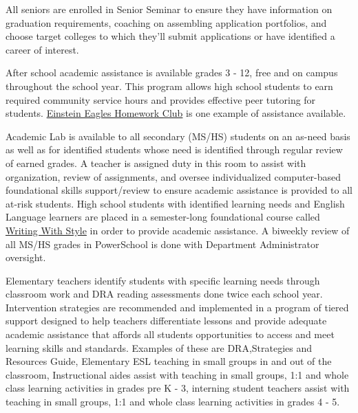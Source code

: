 \begin{findings}
All seniors are enrolled in Senior Seminar to ensure they have information on graduation requirements, coaching on assembling application portfolios, and choose target colleges to which they’ll submit applications or have identified a career of interest.

After school academic assistance is available grades 3 - 12, free and on campus throughout the school year. This program allows high school students to earn required community service hours and provides effective peer tutoring for students.  \href{http://blogs.cmis.ac.th/newsletter/2015/09/17/einstein-eagles-starts-monday-get-involved/}{Einstein Eagles Homework Club} is one example of assistance available.

Academic Lab is available to all secondary (MS/HS) students on an as-need basis as well as for identified students whose need is identified through regular review of earned grades. A teacher is assigned duty in this room to assist with organization, review of assignments, and oversee individualized computer-based foundational skills support/review to ensure academic assistance is provided to all at-risk students. High school students with identified learning needs and English Language learners are placed in a semester-long foundational course called \href{https://drive.google.com/open?id=100aj_4W2p7cnSRhdpkEhTtGRoBIBMe6Uy8JgKBVyofk}{Writing With Style} in order to provide academic assistance. A biweekly review of all MS/HS grades in PowerSchool is done with Department Administrator oversight.

Elementary teachers identify students with specific learning needs through classroom work and DRA reading assessments done twice each school year. Intervention strategies are recommended and implemented in a program of tiered support designed to help teachers differentiate lessons and provide adequate academic assistance that affords all students opportunities to access and meet learning skills and standards. Examples of these are DRA,Strategies and Resources Guide, Elementary ESL teaching in small groups in and out of the classroom, Instructional aides assist with teaching in small groups, 1:1 and whole class learning activities in grades pre K - 3, interning student teachers assist with teaching in small groups, 1:1 and whole class learning activities in grades 4 - 5. 


\end{findings}
